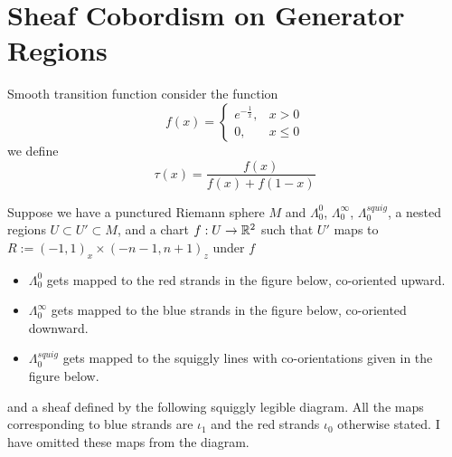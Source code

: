 \section{Sheaf Cobordism on Generator Regions}
\begin{definition}
Smooth transition function consider the function
\[
f(x) =
\begin{cases}
e^{-\frac{1}{x}}, & x > 0 \\
0, & x \leq 0
\end{cases}
\]
we define 
\[
\tau(x) = \frac{f(x)}{f(x)+f(1-x)}
\]
\end{definition}
Suppose we have a punctured Riemann sphere $M$ and $\Lambda_0^0$, $\Lambda_0^\infty$, $\Lambda_0^{squig}$, a nested regions $U\subset U' \subset M$, and a chart $f : U \rightarrow \mathbb{R}^2$ such that $U'$ maps to $R:=(-1,1)_x \times (-n-1,n+1)_z$ under $f$
\begin{itemize}
\item $\Lambda_0^0$ gets mapped to the red strands in the figure below, co-oriented upward.

\item $\Lambda_0^\infty$ gets mapped to the blue strands in the figure below, co-oriented downward.

\item $\Lambda_0^{squig}$ gets mapped to the squiggly lines with co-orientations given in the figure below.
\end{itemize}
and a sheaf defined by the following squiggly legible diagram. All the maps corresponding to blue strands are $\iota_1$ and the red strands $\iota_0$ otherwise stated. I have omitted these maps from the diagram.\\

